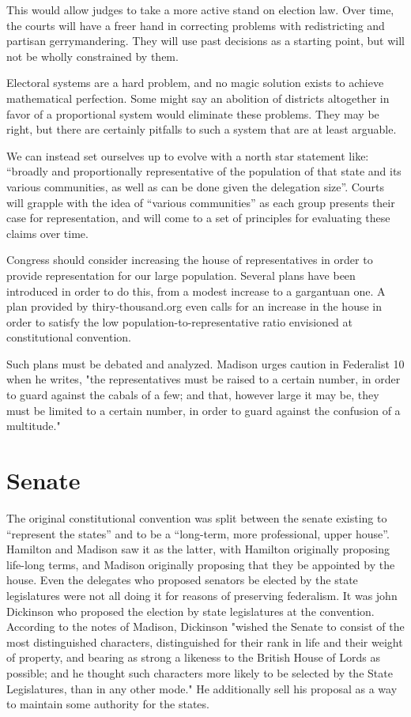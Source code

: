 \documentclass{article}
\begin{document}
This would allow judges to take a more active stand on election law. Over time, the courts will have a freer hand in correcting problems with redistricting and partisan gerrymandering. They will use past decisions as a starting point, but will not be wholly constrained by them.

Electoral systems are a hard problem, and no magic solution exists to achieve mathematical perfection. Some might say an abolition of districts altogether in favor of a proportional system would eliminate these problems. They may be right, but there are certainly pitfalls to such a system that are at least arguable.

We can instead set ourselves up to evolve with a north star statement like: “broadly and proportionally representative of the population of that state and its various communities, as well as can be done given the delegation size”. Courts will grapple with the idea of “various communities” as each group presents their case for representation, and will come to a set of principles for evaluating these claims over time.

Congress should consider increasing the house of representatives in order to provide representation for our large population. Several plans have been introduced in order to do this, from a modest increase to a gargantuan one\cite{Allen}. A plan provided by thiry-thousand.org even calls for an increase in the house in order to satisfy the low population-to-representative ratio envisioned at constitutional convention\cite{30000}.

Such plans must be debated and analyzed. Madison urges caution in Federalist 10 when he writes, "the representatives must be raised to a certain number, in order to guard against the cabals of a few; and that, however large it may be, they must be limited to a certain number, in order to guard against the confusion of a multitude."\cite{Federalist10}

\section{Senate}
\label{section:Senate}

The original constitutional convention was split between the senate existing to “represent the states” and to be a “long-term, more professional, upper house”. Hamilton and Madison saw it as the latter, with Hamilton originally proposing life-long terms, and Madison originally proposing that they be appointed by the house. Even the delegates who proposed senators be elected by the state legislatures were not all doing it for reasons of preserving federalism. It was john Dickinson who proposed the election by state legislatures at the convention. According to the notes of Madison, Dickinson "wished the Senate to consist of the most distinguished characters, distinguished for their rank in life and their weight of property, and bearing as strong a likeness to the British House of Lords as possible; and he thought such characters more likely to be selected by the State Legislatures, than in any other mode." He additionally sell his proposal as a way to maintain some authority for the states.
\end{document}
